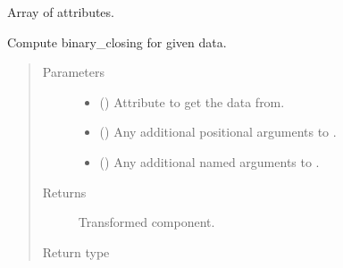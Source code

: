 \documentclass[letterpaper,10pt,english]{sphinxmanual}
\begin{document}
\begin{fulllineitems}
\begin{fulllineitems}
\end{fulllineitems}


\begin{fulllineitems}
\label{\detokenize{api/rock:geology.src.Rock.attributes}}
Array of attributes.

\end{fulllineitems}


\begin{fulllineitems}
\label{\detokenize{api/rock:geology.src.Rock.binary_closing}}
Compute binary\_closing for given data.
\begin{quote}\begin{description}
\item[{Parameters}] \leavevmode\begin{itemize}
\item {} 
 (\sphinxstyleliteralemphasis{\sphinxupquote{, }}) \textendash{} Attribute to get the data from.

\item {} 
 () \textendash{} Any additional positional arguments to .

\item {} 
 () \textendash{} Any additional named arguments to .

\end{itemize}

\item[{Returns}] \leavevmode
{} \textendash{} Transformed component.

\item[{Return type}] \leavevmode
{\hyperref[\detokenize{api/base_classes:geology.src.base_spatial.SpatialComponent}]{}}


\end{description}
\end{quote}
\end{fulllineitems}
\end{fulllineitems}
\end{document}
